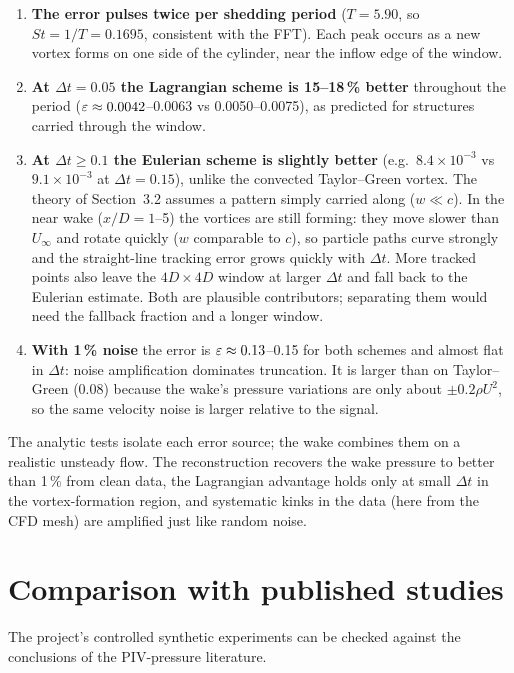 \begin{enumerate}
\item \textbf{The error pulses twice per shedding period} ($T=5.90$, so $St=1/T=0.1695$, consistent with the FFT). Each peak occurs as a new vortex forms on one side of the cylinder, near the inflow edge of the window.
\item \textbf{At $\Delta t=0.05$ the Lagrangian scheme is 15--18\,\% better} throughout the period ($\varepsilon\approx0.0042$--0.0063 vs 0.0050--0.0075), as predicted for structures carried through the window.
\item \textbf{At $\Delta t\ge0.1$ the Eulerian scheme is slightly better} (e.g.\ $8.4\times10^{-3}$ vs $9.1\times10^{-3}$ at $\Delta t=0.15$), unlike the convected Taylor--Green vortex. The theory of Section~3.2 assumes a pattern simply carried along ($w\ll c$). In the near wake ($x/D=1$--5) the vortices are still forming: they move slower than $U_\infty$ and rotate quickly ($w$ comparable to $c$), so particle paths curve strongly and the straight-line tracking error grows quickly with $\Delta t$. More tracked points also leave the $4D\times4D$ window at larger $\Delta t$ and fall back to the Eulerian estimate. Both are plausible contributors; separating them would need the fallback fraction and a longer window.
\item \textbf{With 1\,\% noise} the error is $\varepsilon\approx0.13$--0.15 for both schemes and almost flat in $\Delta t$: noise amplification dominates truncation. It is larger than on Taylor--Green (0.08) because the wake's pressure variations are only about $\pm0.2\rho U^2$, so the same velocity noise is larger relative to the signal.
\end{enumerate}

\begin{keyidea}
The analytic tests isolate each error source; the wake combines them on a realistic unsteady flow. The reconstruction recovers the wake pressure to better than 1\,\% from clean data, the Lagrangian advantage holds only at small $\Delta t$ in the vortex-formation region, and systematic kinks in the data (here from the CFD mesh) are amplified just like random noise.
\end{keyidea}

\chapter{Comparison with published studies}
The project's controlled synthetic experiments can be checked against the conclusions of the PIV-pressure literature.


